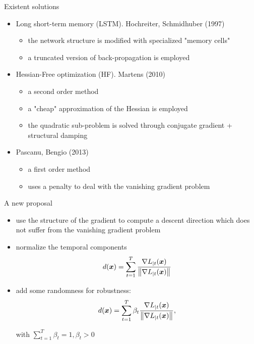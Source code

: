 \begin{frame}{Existent solutions}
	
	\pause
	\begin{itemize}
		\item Long short-term memory (LSTM). Hochreiter, Schmidhuber (1997)
			\begin{itemize}
				\item the network structure is modified with specialized "memory cells"
				\item a truncated version of back-propagation is employed
			\end{itemize}
		\pause
		\item Hessian-Free optimization (HF). Martens (2010)
		\begin{itemize}
			\item a second order method
			\item a "cheap" approximation of the Hessian is employed
			\item the quadratic sub-problem is solved through conjugate gradient + structural damping
		\end{itemize}
		\pause
		\item Pascanu, Bengio (2013)
		\begin{itemize}
			\item a first order method
			\item uses a penalty to deal with the vanishing gradient problem
		\end{itemize}
	\end{itemize}
	
\end{frame}

\begin{frame}{A new proposal}
\begin{itemize}
	\item use the structure of the gradient to compute a descent direction which does not suffer from the vanishing gradient problem
	
	\item normalize the temporal components
	\begin{equation}
	d(\boldsymbol{x}) = \sum_{t=1}^T \frac{\nabla L_{|t}(\boldsymbol{x})}{\left\Vert \nabla L_{|t}(\boldsymbol{x}) \right\Vert}
	\end{equation}
	
	\item add some randomness for robustness:
		\begin{equation}
		d(\boldsymbol{x}) = \sum_{t=1}^T \beta_t\frac{\nabla L_{|t}(\boldsymbol{x})}{\left\Vert \nabla L_{|t}(\boldsymbol{x}) \right\Vert},
		\end{equation}
		
		with $\sum_{t=1}^T\beta_t=1, \beta_t>0$
\end{itemize}



\end{frame}
